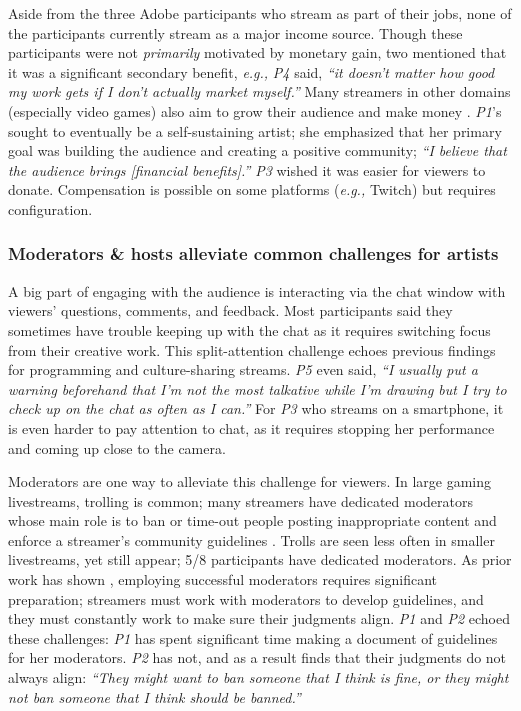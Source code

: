 Aside from the three Adobe participants who stream as part of their jobs, none of the participants currently stream as a major income source. Though these participants were not \textit{primarily} motivated by monetary gain, two mentioned that it was a significant secondary benefit, \textit{e.g., } \textit{P4} said, \textit{``it doesn't matter how good my work gets if I don't actually market myself.''} Many streamers in other domains (especially video games) also aim to grow their audience and make money \cite{Pellicone2017}. \textit{P1}'s sought to eventually be a self-sustaining artist; she emphasized that her primary goal was building the audience and creating a positive community; \textit{``I believe that the audience brings [financial benefits].''} \textit{P3} wished it was easier for viewers to donate. Compensation is possible on some platforms (\textit{e.g.,} Twitch) but requires configuration.

\subsubsection{Moderators \& hosts alleviate common challenges for artists}
A big part of engaging with the audience is interacting via the chat window with viewers' questions, comments, and feedback. 
Most participants said they sometimes have trouble keeping up with the chat as it requires switching focus from their creative work. This split-attention challenge echoes previous findings for programming \cite{Faas2018} and culture-sharing \cite{Lu2019} streams.
\textit{P5} even said, \textit{``I usually put a warning beforehand that I'm not the most talkative while I'm drawing but I try to check up on the chat as often as I can.''} For \textit{P3} who streams on  a smartphone, it is even harder to pay attention to chat, as it requires stopping her performance and coming up close to the camera.

Moderators are one way to alleviate this challenge for viewers. In large gaming livestreams, trolling is common; many streamers have dedicated moderators whose main role is to ban or time-out people posting inappropriate content and enforce a streamer's community guidelines \cite{Seering2017, Lo2018, Seering2019, YvetteWohn2019}. Trolls are seen less often in smaller livestreams, yet still appear; 5/8 participants have dedicated moderators. As prior work has shown  \cite{Lo2018, Seering2019, YvetteWohn2019}, employing successful moderators requires significant preparation; streamers must work with moderators to develop guidelines, and they must constantly work to make sure their judgments align. \textit{P1} and \textit{P2} echoed these challenges: \textit{P1} has spent significant time making a document of guidelines for her moderators. \textit{P2} has not, and as a result finds that their judgments do not always align: \textit{``They might want to ban someone that I think is fine, or they might not ban someone that I think should be banned.''}

